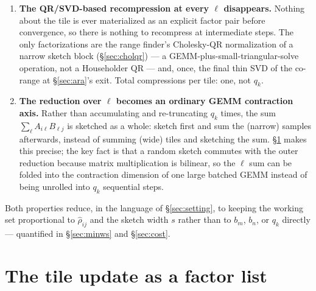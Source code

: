 \documentclass[11pt]{article}
\begin{document}
\begin{enumerate}
\item \textbf{The QR/SVD-based recompression at every $\ell$ disappears.}
  Nothing about the tile is ever materialized as an explicit factor pair
  before convergence, so there is nothing to recompress at intermediate
  steps. The only factorizations are the range finder's Cholesky-QR
  normalization of a narrow sketch block (\S\ref{sec:cholqr}) --- a
  GEMM-plus-small-triangular-solve operation, not a Householder QR --- and,
  once, the final thin SVD of the co-range at \S\ref{sec:ara}'s exit. Total
  compressions per tile: one, not $q_k$.
\item \textbf{The reduction over $\ell$ becomes an ordinary GEMM contraction
  axis.} Rather than accumulating and re-truncating $q_k$ times, the sum
  $\sum_\ell A_{i\ell}B_{\ell j}$ is sketched as a whole: sketch first and sum
  the (narrow) samples afterwards, instead of summing (wide) tiles and
  sketching the sum. \S\ref{sec:factorlist} makes this precise; the key fact
  is that a random sketch commutes with the outer reduction because matrix
  multiplication is bilinear, so the $\ell$ sum can be folded into the
  contraction dimension of one large batched GEMM instead of being unrolled
  into $q_k$ sequential steps.
\end{enumerate}

Both properties reduce, in the language of \S\ref{sec:setting}, to keeping the
working set proportional to $\hat\rho_{ij}$ and the sketch width $s$ rather
than to $b_m$, $b_n$, or $q_k$ directly --- quantified in \S\ref{sec:minws}
and \S\ref{sec:cost}.

\section{The tile update as a factor list}
\label{sec:factorlist}
\end{document}
